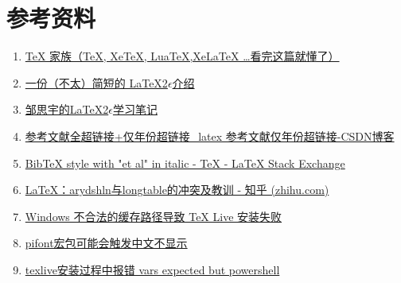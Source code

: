 \chapter*{参考资料}\label{chap:refinfor}
\begin{enumerate}[itemsep=1.5ex]
    \item \href{https://zhuanlan.zhihu.com/p/248669482}{TeX 家族（TeX, XeTeX, LuaTeX,XeLaTeX …看完这篇就懂了）}
    \item \href{http://mirrors.ctan.org/info/lshort/chinese/lshort-zh-cn.pdf}{一份（不太）简短的 \LaTeX{}2$\epsilon$介绍}
    \item \href{https://github.com/zousiyu1995/Study-LaTeX}{邹思宇的\LaTeX{}2$\epsilon$学习笔记}
    \item \href{https://blog.csdn.net/qq_36829039/article/details/123576507}{参考文献全超链接+仅年份超链接\_latex 参考文献仅年份超链接-CSDN博客}
    \item \href{https://tex.stackexchange.com/questions/532367/bibtex-style-with-et-al-in-italic}{BibTeX style with "et al" in italic - TeX - LaTeX Stack Exchange}
    \item \href{https://zhuanlan.zhihu.com/p/667681242}{LaTeX：arydshln与longtable的冲突及教训 - 知乎 (zhihu.com)}
    \item \href{https://syvshc.github.io/2021-04-07-illegal-temp-cause-tlinstall-failure/}{Windows 不合法的缓存路径导致 TeX Live 安装失败}
    \item \href{https://github.com/CTeX-org/ctex-kit/issues/688}{pifont宏包可能会触发中文不显示}
    \item \href{https://blog.csdn.net/qq_50698753/article/details/130475564}{texlive安装过程中报错 vars expected but powershell}
\end{enumerate}